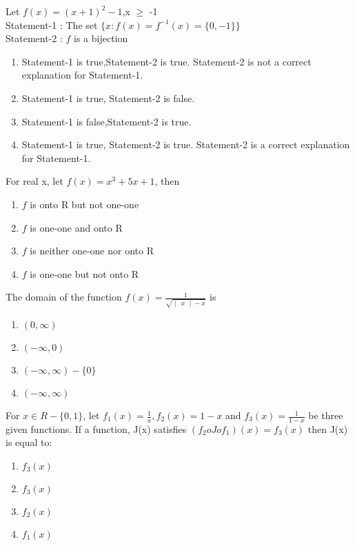 \item Let $f(x)=(x+1)^2-1$,x $\geq$ -1\\
Statement-1 : The set $\lbrace x:f(x)=f^{-1}(x)=\lbrace0,-1\rbrace\rbrace$\\
Statement-2 : $f$ is a bijection
\begin{enumerate}
\item Statement-1 is true,Statement-2 is true. Statement-2 is not a correct explanation for Statement-1.
\item Statement-1 is true, Statement-2 is false.
\item Statement-1 is false,Statement-2 is true.
\item Statement-1 is true, Statement-2 is true. Statement-2 is a correct explanation for Statement-1.
\end{enumerate}

\item For real x, let $f(x)=x^{3}+5x+1$, then 
\begin{enumerate}
\item $f$ is onto R but not one-one
\item $f$ is one-one and onto R
\item $f$ is neither one-one nor onto R
\item $f$ is one-one but not onto R
\end{enumerate}

\item The domain of the function $f(x)=\frac{1}{\sqrt{\begin{vmatrix} x \end{vmatrix} - x}}$ is
\begin{enumerate}
\item $(0,\infty)$
\item $(-\infty,0)$
\item $(-\infty,\infty)-\{0\}$
\item $(-\infty,\infty)$
\end{enumerate}

\item For $x \in R-\{0,1\}$, let $f_{1}(x)=\frac{1}{x}, f_{2}(x)=1-x$ and $f_{3}(x)=\frac{1}{1-x}$ be three given functions. If a function, J(x) satisfies $(f_{2}oJof_{1})(x)=f_{3}(x)$ then J(x) is equal to:
\begin{enumerate}
\item $f_3(x)$
\item $f_3(x)$
\item $f_2(x)$
\item $f_1(x)$
\end{enumerate} 

